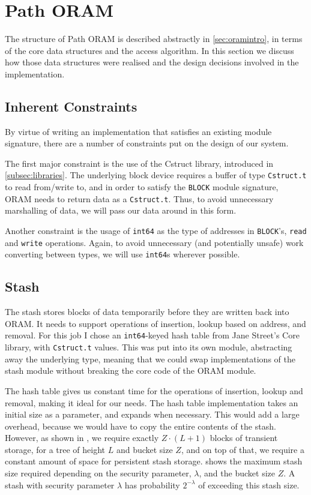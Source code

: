\documentclass[12pt,a4paper,twoside,openright]{report}
\begin{document}
\section{Path ORAM}
\label{sec:pathORAM}

The structure of Path ORAM is described abstractly in \cref{sec:oramintro}, in terms of the core data structures and the access algorithm. In this section we discuss how those data structures were realised and the design decisions involved in the implementation.

\subsection{Inherent Constraints}
\label{subsec:constraints}

By virtue of writing an implementation that satisfies an existing module signature, there are a number of constraints put on the design of our system.

The first major constraint is the use of the Cstruct library, introduced in \cref{subsec:libraries}. The underlying block device requires a buffer of type \texttt{Cstruct.t} to read from/write to, and in order to satisfy the \texttt{BLOCK} module signature, ORAM needs to return data as a \texttt{Cstruct.t}. Thus, to avoid unnecessary marshalling of data, we will pass our data around in this form.

Another constraint is the usage of \texttt{int64} as the type of addresses in \texttt{BLOCK}'s, \texttt{read} and \texttt{write} operations. Again, to avoid unnecessary (and potentially unsafe) work converting between types, we will use \texttt{int64}s wherever possible.

\subsection{Stash}
\label{subsec:stashImpl}

The stash stores blocks of data temporarily before they are written back into ORAM. It needs to support operations of insertion, lookup based on address, and removal. For this job I chose an \texttt{int64}-keyed hash table from Jane Street's Core library, with \texttt{Cstruct.t} values. This was put into its own module, abstracting away the underlying type, meaning that we could swap implementations of the stash module without breaking the core code of the ORAM module.

The hash table gives us constant time for the operations of insertion, lookup and removal, making it ideal for our needs. The hash table implementation takes an initial size as a parameter, and expands when necessary. This would add a large overhead, because we would have to copy the entire contents of the stash. However, as shown in \citet{stefanov2013path}, we require exactly $Z \cdot (L +1)$ blocks of transient storage, for a tree of height $L$ and bucket size $Z$, and on top of that, we require a constant amount of space for persistent stash storage.  shows the maximum stash size required depending on the security parameter, $\lambda$, and the bucket size $Z$. A stash with security parameter $\lambda$ has probability $2^{-\lambda}$ of exceeding this stash size.
\end{document}
